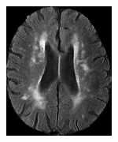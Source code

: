 \documentclass[10pt,twoside]{book}
\begin{document}
\begin{figure}
  \centering
  \begin{subfigure}{0.32\textwidth}
    \centering
    \includegraphics[width=\textwidth]{data}
    \caption{}
    \label{fig:whiteMatterHyperIntensities_a}
  \end{subfigure}
  \begin{subfigure}{0.32\textwidth}
    \centering

\end{subfigure}
\end{figure}
\end{document}

